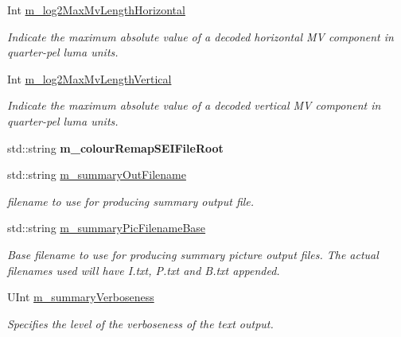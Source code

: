 \begin{DoxyCompactItemize}
\mbox{\label{class_t_app_enc_cfg_ab960226ce4d5fc9281853e7fd388a67a}} 
Int \hyperlink{class_t_app_enc_cfg_ab960226ce4d5fc9281853e7fd388a67a}{m\+\_\+log2\+Max\+Mv\+Length\+Horizontal}
\begin{DoxyCompactList}\small\item\em Indicate the maximum absolute value of a decoded horizontal MV component in quarter-\/pel luma units. \end{DoxyCompactList}\item 
\mbox{\label{class_t_app_enc_cfg_a9a10dfa4f195a962ce34afd349f684a3}} 
Int \hyperlink{class_t_app_enc_cfg_a9a10dfa4f195a962ce34afd349f684a3}{m\+\_\+log2\+Max\+Mv\+Length\+Vertical}
\begin{DoxyCompactList}\small\item\em Indicate the maximum absolute value of a decoded vertical MV component in quarter-\/pel luma units. \end{DoxyCompactList}\item 
\mbox{\label{class_t_app_enc_cfg_a95d08ef30c2fdcfdef97e80e94dec113}} 
std\+::string {\bfseries m\+\_\+colour\+Remap\+S\+E\+I\+File\+Root}
\item 
\mbox{\label{class_t_app_enc_cfg_ac1749ad753e1810ab8b9f1a3f52fad05}} 
std\+::string \hyperlink{class_t_app_enc_cfg_ac1749ad753e1810ab8b9f1a3f52fad05}{m\+\_\+summary\+Out\+Filename}
\begin{DoxyCompactList}\small\item\em filename to use for producing summary output file. \end{DoxyCompactList}\item 
\mbox{\label{class_t_app_enc_cfg_aa858e9f71c2a731bc139cc6c4aba9bd9}} 
std\+::string \hyperlink{class_t_app_enc_cfg_aa858e9f71c2a731bc139cc6c4aba9bd9}{m\+\_\+summary\+Pic\+Filename\+Base}
\begin{DoxyCompactList}\small\item\em Base filename to use for producing summary picture output files. The actual filenames used will have I.\+txt, P.\+txt and B.\+txt appended. \end{DoxyCompactList}\item 
\mbox{\label{class_t_app_enc_cfg_aa6b1fbcf5ca1462dbb364d72810130f6}} 
U\+Int \hyperlink{class_t_app_enc_cfg_aa6b1fbcf5ca1462dbb364d72810130f6}{m\+\_\+summary\+Verboseness}
\begin{DoxyCompactList}\small\item\em Specifies the level of the verboseness of the text output. \end{DoxyCompactList}\end{DoxyCompactItemize}
